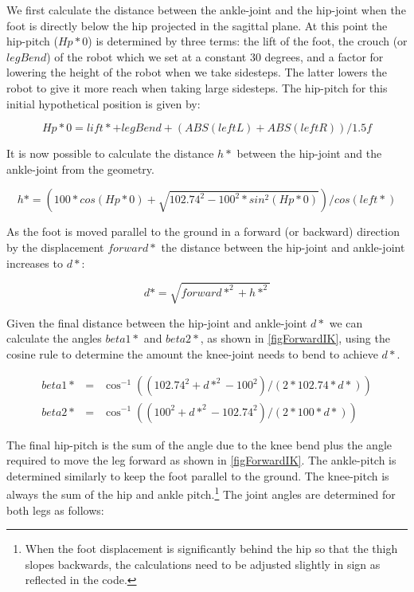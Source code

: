 \documentclass[pdftex,11pt,a4paper]{report}
\begin{document}
We first calculate the distance between the ankle-joint and the hip-joint when the foot is directly below the hip projected in the sagittal plane. At this point the hip-pitch ($Hp{*}0$) is determined by three terms: the lift of the foot, the crouch (or $legBend$) of the robot which we set at a constant 30 degrees, and a factor for lowering the height of the robot when we take sidesteps. The latter lowers the robot to give it more reach when taking large sidesteps. The hip-pitch for this initial hypothetical position is given by:

\begin{equation}
Hp{*}0    = lift{*} + legBend + (ABS(leftL) + ABS(leftR))/1.5f
\end{equation}

It is now possible to calculate the distance $h*$ between the hip-joint and the ankle-joint from the geometry.

\begin{equation}
h* = (100*cos(Hp{*}0)+ \sqrt{102.74^2 - 100^2*sin^2(Hp{*}0)})/ cos(left{*})
\end{equation}

As the foot is moved parallel to the ground in a forward (or backward) direction by the displacement $forward{*}$ the distance between the hip-joint and ankle-joint increases to $d{*}$:

\begin{equation}
d*  = \sqrt{forward{*}^2 + h{*}^2}
\end{equation}

Given the final distance between the hip-joint and ankle-joint $d{*}$ we can calculate the angles $beta1{*}$ and $beta2{*}$, as shown  in \autoref{figForwardIK}, using the cosine rule to determine the amount the knee-joint needs to bend to achieve $d{*}$.

\begin{eqnarray}
beta1{*}  &=& \cos^{-1}((102.74^2+d{*}^2 - 100^2)/(2*102.74*d{*}))\\
beta2{*}  &=& \cos^{-1}((100^2+d{*}^2 - 102.74^2)/(2*100*d{*}))
\end{eqnarray}

The final hip-pitch is the sum of the angle due to the knee bend plus the angle required to move the leg forward as shown in \autoref{figForwardIK}.  The ankle-pitch is determined similarly to keep the foot parallel to the ground. The knee-pitch is always the sum of the hip and ankle pitch.\footnote{When the foot displacement is significantly behind the hip so that the thigh slopes backwards, the calculations need to be adjusted slightly in sign as reflected in the code.} The joint angles are determined for both legs as follows:
\end{document}
